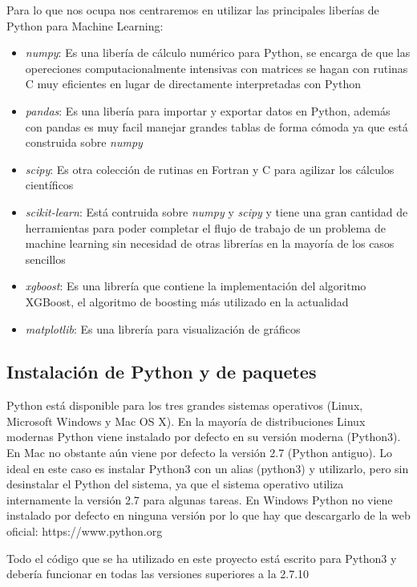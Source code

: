 Para lo que nos ocupa nos centraremos en utilizar las principales liberías de Python para Machine Learning:  

\begin{itemize} 
	\item{\textit{numpy}: Es una libería de cálculo numérico para Python, se encarga de que las opereciones computacionalmente intensivas con matrices se hagan con rutinas C muy eficientes en lugar de directamente interpretadas con Python}
	\item{\textit{pandas}: Es una libería para importar y exportar datos en Python, además con pandas es muy facil manejar grandes tablas de forma cómoda ya que está construida sobre \textit{numpy}} 
	\item{\textit{scipy}: Es otra colección de rutinas en Fortran y C para agilizar los cálculos científicos} 
	\item{\textit{scikit-learn}: Está contruida sobre \textit{numpy} y \textit{scipy} y tiene una gran cantidad de herramientas para poder completar el flujo de trabajo de un problema de machine learning sin necesidad de otras librerías en la mayoría de los casos sencillos} 
	\item{\textit{xgboost}: Es una librería que contiene la implementación del algoritmo XGBoost, el algoritmo de boosting más utilizado en la actualidad} 
	\item{\textit{matplotlib}: Es una librería para visualización de gráficos} 
\end{itemize}

\subsection{Instalación de Python y de paquetes}
Python está disponible para los tres grandes sistemas operativos (Linux, Microsoft Windows y Mac OS X).  
En la mayoría de distribuciones Linux modernas Python viene instalado por defecto en su versión moderna (Python3).  
En Mac no obstante aún viene por defecto la versión 2.7 (Python antiguo).
Lo ideal en este caso es instalar Python3 con un alias (python3) y utilizarlo, pero sin desinstalar el Python del sistema, ya que el sistema operativo utiliza internamente la versión 2.7 para algunas tareas.  
En Windows Python no viene instalado por defecto en ninguna versión por lo que hay que descargarlo de la web oficial: https://www.python.org  

Todo el código que se ha utilizado en este proyecto está escrito para Python3 y debería funcionar en todas las versiones superiores a la 2.7.10  

